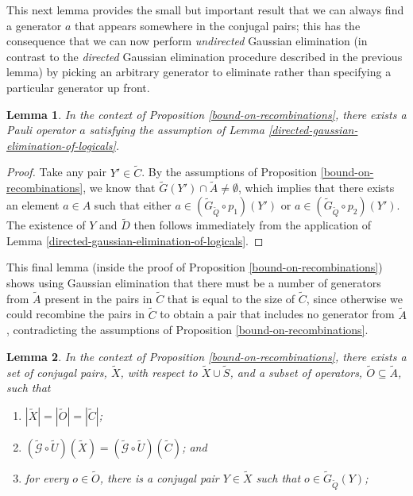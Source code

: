 \documentclass[twocolumn,showpacs,preprintnumbers,amsmath,amssymb,nofootinbib,pra,floatfix]{revtex4-1}
\newtheorem{lemma}{Lemma}
\newenvironment{remark}[1][Remark]{\begin{trivlist}
\item[\hskip \labelsep {\bfseries #1}]}{\end{trivlist}}
\newcommand{\set}{\tilde}
\newcommand{\genfun}{\tilde{\mathcal{G}}}
\begin{document}
\begin{remark}
This next lemma provides the small but important result that we can always find a generator $a$ that appears somewhere in the conjugal pairs;  this has the consequence that we can now perform \emph{undirected} Gaussian elimination (in contrast to the \emph{directed} Gaussian elimination procedure described in the previous lemma) by picking an arbitrary generator to eliminate rather than specifying a particular generator up front.
\end{remark}

\begin{lemma}
\label{undirected-gaussian-elimination-of-logicals}
In the context of Proposition \ref{bound-on-recombinations}, there exists a Pauli operator $a$ satisfying the assumption of Lemma \ref{directed-gaussian-elimination-of-logicals}.
\end{lemma}

\begin{proof}
Take any pair $Y'\in\set C$.  By the assumptions of Proposition \ref{bound-on-recombinations}, we know that $\set G(Y')\cap \set A \ne \emptyset$, which implies that there exists an element $a\in A$ such that either $a\in (\set G_{\set Q}\circ p_1)(Y')$ or $a\in (\set G_{\set Q}\circ p_2)(Y')$.  The existence of $Y$ and $\set D$ then follows immediately from the application of Lemma \ref{directed-gaussian-elimination-of-logicals}.
\end{proof}
\begin{remark}
This final lemma (inside the proof of Proposition \ref{bound-on-recombinations}) shows using Gaussian elimination that there must be a number of generators from $\set A$ present in the pairs in $\set C$ that is equal to the size of $\set C$, since otherwise we could recombine the pairs in $\set C$ to obtain a pair that includes no generator from $\set A$, contradicting the assumptions of Proposition \ref{bound-on-recombinations}.
\end{remark}
\begin{lemma}
\label{elimination-to-create-subset}
In the context of Proposition \ref{bound-on-recombinations}, there exists a set of conjugal pairs, $\set X$, with respect to $\set X\cup\set S$, and a subset of operators, $\set O\subseteq \set A$, such that
\begin{enumerate}
\item $|\set X|=|\set O|=|\set C|$;
\item $(\genfun\circ\set U)(\set X)=(\genfun\circ\set U)(\set C)$; and
\item for every $o\in\set O$, there is a conjugal pair $Y\in\set X$ such that $o\in\set G_{\set Q}(Y)$;
\end{enumerate}
\end{lemma}
\end{document}
